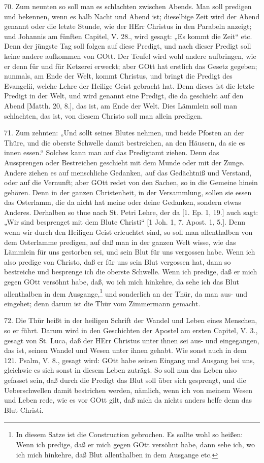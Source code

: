 70. Zum neunten so soll man es schlachten zwischen Abends. Man soll predigen und bekennen, wenn es halb Nacht und Abend ist; dieselbige Zeit wird der Abend genannt oder die letzte Stunde, wie der HErr Christus in den Parabeln anzeigt; und Johannis am fünften Capitel, V. 28., wird gesagt: „Es kommt die Zeit“ etc. Denn der jüngste Tag soll folgen auf diese Predigt, und nach dieser Predigt soll keine andere aufkommen von GOtt. Der Teufel wird wohl andere aufbringen, wie er denn für und für Ketzerei erweckt; aber GOtt hat erstlich das Gesetz gegeben; nunmals, am Ende der Welt, kommt Christus, und bringt die Predigt des Evangelii, welche Lehre der Heilige Geist gebracht hat. Denn dieses ist die letzte Predigt in der Welt, und wird genannt eine Predigt, die da geschieht auf den Abend [Matth. 20, 8.], das ist, am Ende der Welt. Dies Lämmlein soll man schlachten, das ist, von diesem Christo soll man allein predigen.

71. Zum zehnten: „Und sollt seines Blutes nehmen, und beide Pfosten an der Thüre, und die oberste Schwelle damit bestreichen, an den Häusern, da sie es innen essen.“ Solches kann man auf das Predigtamt ziehen. Denn das Aussprengen oder Bestreichen geschieht mit dem Munde oder mit der Zunge. Andere ziehen es auf menschliche Gedanken, auf das Gedächtniß und Verstand, oder auf die Vernunft; aber GOtt redet von den Sachen, so in die Gemeine hinein gehören. Denn in der ganzen Christenheit, in der Versammlung, sollen sie essen das Osterlamm, die da nicht hat meine oder deine Gedanken, sondern etwas Anderes. Derhalben so thue nach St. Petri Lehre, der da [1. Ep. 1, 19.] auch sagt: „Wir sind besprenget mit dem Blute Christi“ [1 Joh. 1, 7. Apost. 1, 5.]. Denn wenn wir durch den Heiligen Geist erleuchtet sind, so soll man allenthalben von dem Osterlamme predigen, auf daß man in der ganzen Welt wisse, wie das Lämmlein für uns gestorben sei, und sein Blut für uns vergossen habe. Wenn ich also predige von Christo, daß er für uns sein
Blut vergossen hat, dann so bestreiche und besprenge ich die oberste Schwelle. Wenn ich predige, daß er mich gegen GOtt versöhnt habe, daß, wo ich mich hinkehre, da sehe ich das Blut allenthalben in dem Ausgange,\footnote{In diesem Satze ist die Construction gebrochen. Es sollte wohl so heißen: Wenn ich predige, daß er mich gegen GOtt versöhnt habe, dann sehe ich, wo ich mich hinkehre, daß Blut allenthalben in dem Ausgange etc.} und sonderlich an der Thür, da man aus- und eingehet; denn darum ist die Thür vom Zimmermann gemacht.

72. Die Thür heißt in der heiligen Schrift der Wandel und Leben eines Menschen, so er führt. Darum wird in den Geschichten der Apostel am ersten Capitel, V. 3., gesagt von St. Luca, daß der HErr Christus unter ihnen sei aus- und eingegangen, das ist, seinen Wandel und Wesen unter ihnen gehabt. Wie sonst auch in dem 121. Psalm, V. 8., gesagt wird: GOtt habe seinen Eingang und Ausgang bei uns, gleichwie es sich sonst in diesem Leben zuträgt. So soll nun das Leben also gefasset sein, daß durch die Predigt das Blut soll über sich gesprengt, und die Ueberschwellen damit bestrichen werden, nämlich, wenn ich von meinem Wesen und Leben rede, wie es vor GOtt gilt, daß mich da nichts anders helfe denn das Blut Christi.

